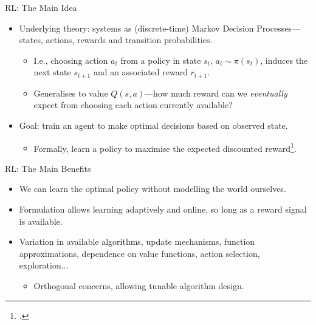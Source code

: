 \documentclass[aspectratio=169,xcolor={dvipsnames}
,hide notes
]{beamer}
\begin{document}
\begin{frame}{RL: The Main Idea\texttrademark}
	\begin{itemize}
		\item Underlying theory: systems as (discrete-time) \alert{Markov Decision Processes}---states, actions, rewards and transition probabilities.
		\begin{itemize}
			\item I.e., choosing action $a_t$ from a policy in state $s_t$, $a_t \sim \pi(s_t)$, induces the next state $s_{t+1}$ and an associated reward $r_{t+1}$.
			\item Generalises to \alert{value} $Q(s,a)$---how much reward can we \emph{eventually} expect from choosing each action currently available?
		\end{itemize}
	
	\item Goal: train an agent to make optimal decisions based on observed state.
	\begin{itemize}
		\item Formally, learn a \alert{policy} to maximise the \alert{expected discounted reward}\footcite{RL2E}.
	\end{itemize}
	
	\end{itemize}
\end{frame}

\begin{frame}{RL: The Main Benefits\texttrademark}
\begin{itemize}
	\item We can learn the optimal policy \alert{without modelling the world ourselves}.
	\item Formulation allows learning adaptively and online, so long as a reward signal is available.
	\item Variation in available algorithms, update mechanisms, function approximations, dependence on value functions, action selection, exploration...
	\begin{itemize}
		\item Orthogonal concerns, allowing tunable algorithm design.
	\end{itemize}
\end{itemize}
\end{frame}
\end{document}
